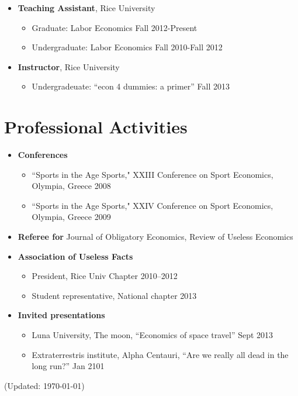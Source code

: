 \documentclass{article}[12]
\begin{document}
\begin{itemize}[itemsep=0.5em]
    
    \item \textbf{Teaching Assistant}, Rice University 
    \begin{itemize}
        \item Graduate: Labor Economics \hfill Fall 2012-Present 
        \item Undergraduate: Labor Economics \hfill Fall 2010-Fall 2012
    \end{itemize}
    
    \item \textbf{Instructor}, Rice University
    \begin{itemize}
        \item Undergradeuate: ``econ 4 dummies: a primer''  \hfill Fall 2013
    \end{itemize}

\end{itemize}


\section{Professional Activities}

\begin{itemize}[itemsep=0.5em]

    \item \textbf{Conferences}
    \begin{itemize}
        \item ``Sports in the Age Sports," XXIII Conference on Sport Economics, Olympia, Greece \hfill 2008
        \item ``Sports in the Age Sports," XXIV Conference on Sport Economics, Olympia, Greece \hfill 2009
    \end{itemize}

    \item \textbf{Referee for} Journal of Obligatory Economics, Review of Useless Economics
    
    \item \textbf{Association of Useless Facts}
    \begin{itemize}
        \item President, Rice Univ Chapter \hfill 2010--2012
        \item Student representative, National chapter \hfill 2013
    \end{itemize}
    
    \item \textbf{Invited presentations}
    \begin{itemize}
        \item Luna University, The moon, ``Economics of space travel'' \hfill Sept 2013
        \item Extraterrestris institute, Alpha Centauri, ``Are we really all dead in the long run?'' \hfill Jan 2101
    \end{itemize}
    
\end{itemize}

\vfill

\begin{center}
(Updated: \mydate\today)
\end{center}
\end{document}

